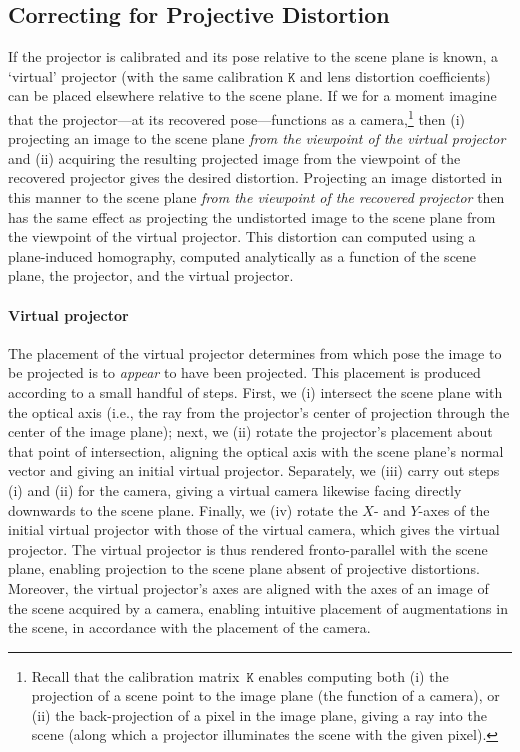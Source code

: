 \documentclass[review]{elsarticle}
\begin{document}
\subsection{Correcting for Projective Distortion}\label{sec:approach:homography}

If the projector is calibrated and its pose relative to the scene plane is known, a `virtual' projector (with the same calibration $\mathtt{K}$ and lens distortion coefficients) can be placed elsewhere relative to the scene plane. If we for a moment imagine that the projector---at its recovered pose---functions as a camera,\footnote{Recall that the calibration matrix~$\mathtt{K}$ enables computing both (i) the projection of a scene point to the image plane (the function of a camera), or (ii) the back-projection of a pixel in the image plane, giving a ray into the scene (along which a projector illuminates the scene with the given pixel).} then (i) projecting an image to the scene plane \textit{from the viewpoint of the virtual projector} and (ii) acquiring the resulting projected image from the viewpoint of the recovered projector gives the desired distortion. Projecting an image distorted in this manner to the scene plane \textit{from the viewpoint of the recovered projector} then has the same effect as projecting the undistorted image to the scene plane from the viewpoint of the virtual projector. This distortion can computed using a plane-induced homography, computed analytically as a function of the scene plane, the projector, and the virtual projector.

\paragraph{Virtual projector} The placement of the virtual projector determines from which pose the image to be projected is to \textit{appear} to have been projected. This placement is produced according to a small handful of steps. First, we (i) intersect the scene plane with the optical axis (i.e., the ray from the projector's center of projection through the center of the image plane); next, we (ii) rotate the projector's placement about that point of intersection, aligning the optical axis with the scene plane's normal vector and giving an initial virtual projector. Separately, we (iii) carry out steps (i) and (ii) for the camera, giving a virtual camera likewise facing directly downwards to the scene plane. Finally, we (iv) rotate the $X$- and $Y$-axes of the initial virtual projector with those of the virtual camera, which gives the virtual projector. The virtual projector is thus rendered fronto-parallel with the scene plane, enabling projection to the scene plane absent of projective distortions. Moreover, the virtual projector's axes are aligned with the axes of an image of the scene acquired by a camera, enabling intuitive placement of augmentations in the scene, in accordance with the placement of the camera. 
\end{document}
